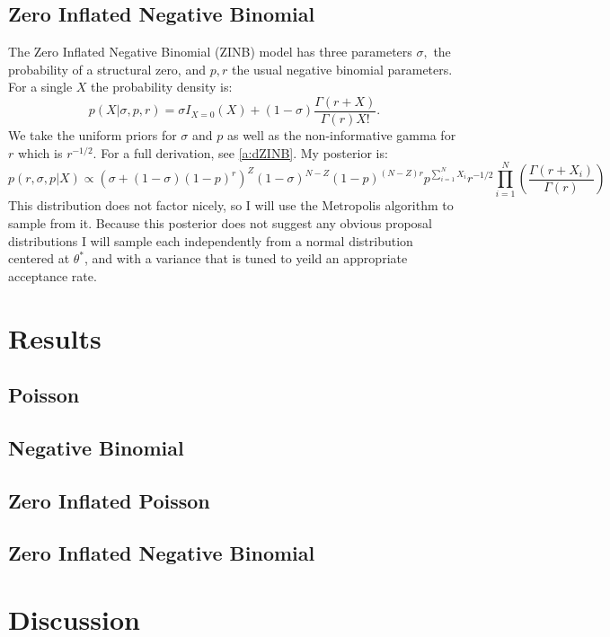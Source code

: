 \documentclass{article}
\begin{document}
\subsection{Zero Inflated Negative Binomial}
\label{ss:mZiNBinom}
The Zero Inflated Negative Binomial (ZINB) model has three parameters $\sigma,$ the probability of a structural zero, and $p,r$ the usual negative binomial parameters. 
For a single $X$ the probability density is: 
$$p(X|\sigma, p, r) = \sigma I_{X=0}(X) + (1-\sigma)\frac{\Gamma(r+X)}{\Gamma(r)X!}.$$
We take the uniform priors for $\sigma$ and $p$ as well as the non-informative gamma for $r$ which is $r^{-1/2}$. For a full derivation, see \ref{a:dZINB}. My posterior is:
$$p(r,\sigma, p|X)\propto\left(\sigma + (1-\sigma)(1-p)^r\right)^Z(1-\sigma)^{N-Z}(1-p)^{(N-Z)r}p^{\sum_{i=1}^NX_i}r^{-1/2}\prod_{i=1}^N\left(\frac{\Gamma(r+X_i)}{\Gamma(r)}\right)$$
This distribution does not factor nicely, so I will use the Metropolis algorithm to sample from it. 
Because this posterior does not suggest any obvious proposal distributions I will sample each independently from a normal distribution centered at $\theta^*$, and with a variance that is tuned to yeild an appropriate acceptance rate.

\section{Results}
\label{s:results}
\subsection{Poisson}
\label{ss:rPoisson}

\subsection{Negative Binomial}
\label{ss:rNBinom}

\subsection{Zero Inflated Poisson}
\label{ss:rZiPoisson}

\subsection{Zero Inflated Negative Binomial}
\label{ss:rZiNBinom}

\section{Discussion}
\label{s:discussion}
\end{document}
